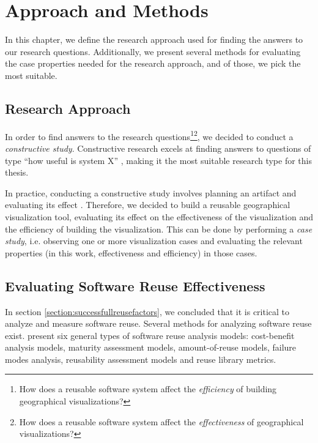 
\chapter{Approach and Methods}
\label{chapter:methods}

In this chapter, we define the research approach used for finding the answers to our research questions. Additionally, we present several methods for evaluating the case properties needed for the research approach, and of those, we pick the most suitable.

\section{Research Approach}

In order to find answers to the research questions\footnote{How does a reusable software system affect the \emph{efficiency} of building geographical visualizations?}\footnote{How does a reusable software system affect the \emph{effectiveness} of geographical visualizations?}, we decided to conduct a \emph{constructive study}. Constructive research excels at finding answers to questions of type ``how useful is system X'' \citep{jarvinen_tutkimustyon_2012}, making it the most suitable research type for this thesis.

In practice, conducting a constructive study involves planning an artifact and evaluating its effect \citep{jarvinen_tutkimustyon_2012}. Therefore, we decided to build a reusable geographical visualization tool, evaluating its effect on the effectiveness of the visualization and the efficiency of building the visualization. This can be done by performing a \emph{case study}, i.e. observing one or more visualization cases and evaluating the relevant properties (in this work, effectiveness and efficiency) in those cases.

\section{Evaluating Software Reuse Effectiveness}

In section \ref{section:successfullreusefactors}, we concluded that it is critical to analyze and measure software reuse. Several methods for analyzing software reuse exist. \citet{frakes_software_1996} present six general types of software reuse analysis models: cost-benefit analysis models, maturity assessment models, amount-of-reuse models, failure modes analysis, reusability assessment models and reuse library metrics. 

